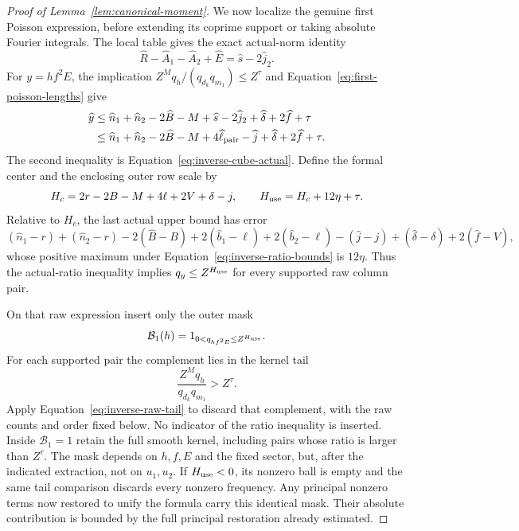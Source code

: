 \documentclass[12pt]{article}
\begin{document}
\begin{proof}[Proof of Lemma~\ref{lem:canonical-moment}]
We now localize the genuine first Poisson expression, before extending its
coprime support or taking absolute Fourier integrals.  The local table gives
the exact actual-norm identity
\[
 \widehat R-\widehat A_1-\widehat A_2+\widehat E
       =\widehat s-2\widehat j_2.
\]
For \(y=hf^2E\), the implication
\(Z^Mq_h/(q_{d_k}q_{m_1})\le Z^\tau\) and
Equation~\eqref{eq:first-poisson-lengths} give
\[
 \begin{split}
 \widehat y
 &\le \widehat n_1+\widehat n_2-2\widehat B-M
       +\widehat s-2\widehat j_2+\widehat\delta+2\widehat f+\tau\\
 &\le \widehat n_1+\widehat n_2-2\widehat B-M
       +4\widehat\ell_{\rm pair}-\widehat j
       +\widehat\delta+2\widehat f+\tau.
 \end{split}
\]
The second inequality is Equation~\eqref{eq:inverse-cube-actual}.
Define the formal center and the enclosing outer row scale by
\begin{equation}\label{eq:enlarged-first-frequency}
 H_c=2r-2B-M+4\ell+2V+\delta-j,\qquad
 H_{\rm use}=H_c+12\eta+\tau.
\end{equation}
Relative to \(H_c\), the last actual upper bound has error
\[
 (\widehat n_1-r)+(\widehat n_2-r)-2(\widehat B-B)
 +2(\widehat b_1-\ell)+2(\widehat b_2-\ell)
 -(\widehat j-j)+(\widehat\delta-\delta)+2(\widehat f-V),
\]
whose positive maximum under Equation~\eqref{eq:inverse-ratio-bounds} is
\(12\eta\).  Thus the actual-ratio inequality implies
\(q_y\le Z^{H_{\rm use}}\) for every supported raw column pair.

On that raw expression insert only the outer mask
\[
 \mathcal B_1(h)=1_{0<q_{hf^2E}\le Z^{H_{\rm use}}}.
\]
For each supported pair the complement lies in the kernel tail
\[
 \frac{Z^Mq_h}{q_{d_k}q_{m_1}}>Z^\tau.
\]
Apply
Equation~\eqref{eq:inverse-raw-tail} to discard that complement, with the
raw counts and order fixed below.  No indicator of the ratio inequality
is inserted.  Inside \(\mathcal B_1=1\) retain the full smooth kernel,
including pairs whose ratio is larger than \(Z^\tau\).  The mask depends
on \(h,f,E\) and the fixed sector, but, after the indicated extraction,
not on \(u_1,u_2\).  If \(H_{\rm use}<0\), its nonzero ball is empty and
the same tail comparison discards every nonzero frequency.  Any principal
nonzero terms now restored to unify the formula carry this identical mask.
Their absolute contribution is bounded by the full principal restoration
already estimated.


\end{proof}
\end{document}
